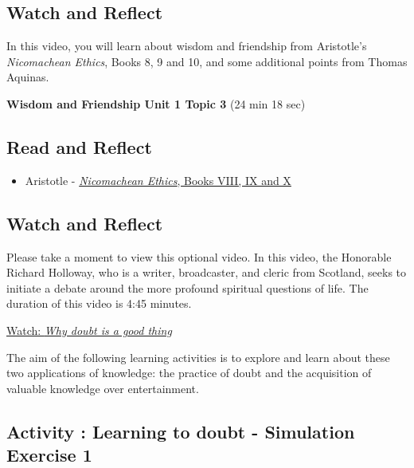 \documentclass[
]{book}
\providecommand{\tightlist}{%
  \setlength{\itemsep}{0pt}\setlength{\parskip}{0pt}}
\begin{document}
\hypertarget{watch-and-reflect-3}{%
\subsection*{Watch and Reflect}\label{watch-and-reflect-3}}

In this video, you will learn about wisdom and friendship from Aristotle's \emph{Nicomachean Ethics}, Books 8, 9 and 10, and some additional points from Thomas Aquinas.

\textbf{Wisdom and Friendship Unit 1 Topic 3} (24 min 18 sec)

\hypertarget{read-and-reflect-2}{%
\subsection*{Read and Reflect}\label{read-and-reflect-2}}

\begin{itemize}
\tightlist
\item
  Aristotle - \href{assets/u1/PHIL-100-Aristotle-NE-VIII-IX-X.pdf}{\emph{Nicomachean Ethics}, Books VIII, IX and X}
\end{itemize}

\hypertarget{watch-and-reflect-4}{%
\subsection*{Watch and Reflect}\label{watch-and-reflect-4}}

\begin{reflect}
Please take a moment to view this optional video. In this video, the Honorable Richard Holloway, who is a writer, broadcaster, and cleric from Scotland, seeks to initiate a debate around the more profound spiritual questions of life. The duration of this video is 4:45 minutes.

\href{https://www.youtube.com/watch?v=LERi_Xjfio4}{Watch: \emph{Why doubt is a good thing}}
\end{reflect}

The aim of the following learning activities is to explore and learn about these two applications of knowledge: the practice of doubt and the acquisition of valuable knowledge over entertainment.

\hypertarget{activity-learning-to-doubt---simulation-exercise-1}{%
\subsection*{Activity : Learning to doubt - Simulation Exercise 1}\label{activity-learning-to-doubt---simulation-exercise-1}}
\end{document}
